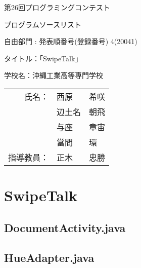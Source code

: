 \documentclass[11pt,a4j]{jarticle}
\begin{document}
\vspace*{-20mm}
{\Large

\begin{flushleft}
第26回プログラミングコンテスト
\end{flushleft}

\vspace{-15mm}
\begin{flushright}
プログラムソースリスト
\end{flushright}
}

\vspace{20mm}

\begin{center}
{\huge

{自由部門 : 発表順番号(登録番号)  4(20041)}

\vspace{20mm}
タイトル：「SwipeTalk」


\vspace{20mm}
学校名：沖縄工業高等専門学校\\

\hspace{0mm}
\vspace{0mm}

\begin{tabular}{r l l}
氏名：& 西原 & 希咲\\
	 & 辺土名 & 朝飛 \\
	 & 与座 & 章宙 \\
	 & 當間 & 環 \\
指導教員：& 正木 & 忠勝 \\
\end{tabular}
}

\end{center}


\thispagestyle{empty}
\newpage
\setcounter{page}{1}



\tableofcontents


\thispagestyle{empty}
\newpage
\setcounter{page}{1}




\section{SwipeTalk}
\subsection{DocumentActivity.java}
	
	\newpage
\subsection{HueAdapter.java}
	
	\newpage	
\end{document}
